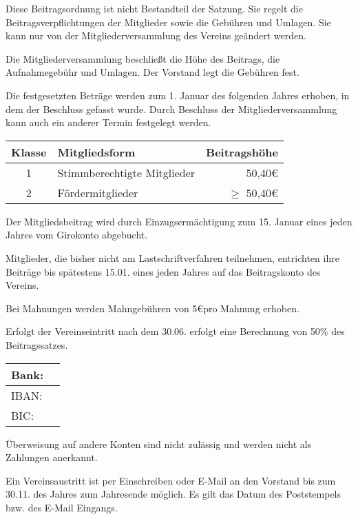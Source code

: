 \begin{beitrag}

  Diese Beitragsordnung ist nicht Bestandteil der Satzung. Sie regelt die Beitragsverpflichtungen der Mitglieder sowie die Gebühren und Umlagen. Sie kann nur von der Mitgliederversammlung des Vereins geändert werden.

  Die Mitgliederversammlung beschließt die Höhe des Beitrags, die Aufnahmegebühr und Umlagen. Der Vorstand legt die Gebühren fest.

  Die festgesetzten Beträge werden zum 1. Januar des folgenden Jahres erhoben, in dem der Beschluss gefasst wurde. Durch Beschluss der Mitgliederversammlung kann auch ein anderer Termin festgelegt werden.


  \begin{center}
    \begin{tabular}{ |c|l|r| }
      \hline
      Klasse & Mitgliedsform               & Beitragshöhe     \\
      \hline \hline
      1      & Stimmberechtigte Mitglieder & 50,40\euro       \\
      2      & Fördermitglieder            & $\ge$ 50,40\euro \\
      \hline
    \end{tabular}
  \end{center}

  Der Mitgliedsbeitrag wird durch Einzugsermächtigung zum 15. Januar eines jeden Jahres vom Girokonto abgebucht.

  Mitglieder, die bisher nicht am Lastschriftverfahren teilnehmen, entrichten ihre Beiträge bis spätestens 15.01. eines jeden Jahres auf das Beitragskonto des Vereins.

  Bei Mahnungen werden Mahngebühren von 5\euro pro Mahnung erhoben.

  Erfolgt der Vereinseintritt nach dem 30.06. erfolgt eine Berechnung von 50\% des Beitragssatzes.


  \begin{center}
    \begin{tabular}{ |ll| }
      \hline
      Bank: & \\
      \hline
      IBAN: & \\
      \hline
      BIC:  & \\
      \hline
    \end{tabular}
  \end{center}

  Überweisung auf andere Konten sind nicht zulässig und werden nicht als Zahlungen anerkannt.

  Ein Vereinsaustritt ist per Einschreiben oder E-Mail an den Vorstand bis zum 30.11. des Jahres zum Jahresende möglich. Es gilt das Datum des Poststempels bzw. des E-Mail Eingangs.

\end{beitrag}

